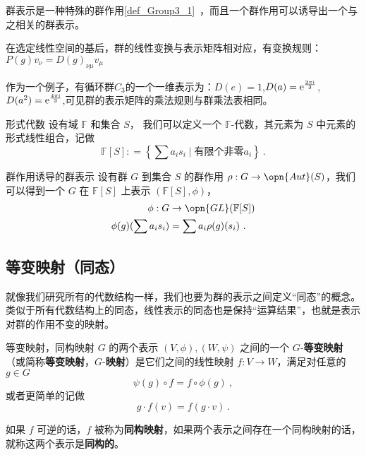 群表示是一种特殊的群作用\autoref{def_Group3_1}~，而且一个群作用可以诱导出一个与之相关的群表示。

在选定线性空间的基后，群的线性变换与表示矩阵相对应，有变换规则：$P(g)v_\nu=D(g)_{\nu\mu}v_\mu$

作为一个例子，有循环群$C_3$的一个一维表示为：$D(e)=1$,$D(a)=\rm{e}^{\frac{2\pi i}{3}}$,$D(a^2)=\rm{e}^{\frac{4\pi i}{3}}$,可见群的表示矩阵的乘法规则与群乘法表相同。


\begin{definition}{形式代数}
设有域 $\mathbb{F}$ 和集合 $S$， 我们可以定义一个 $\mathbb{F}$-代数，其元素为 $S$ 中元素的形式线性组合，记做
$$
\mathbb{F}[S]: = \left\{ \sum a_i s_i \mid \text{有限个非零} a_i \right\}~.
$$
\end{definition}

\begin{definition}{群作用诱导的群表示}
设有群 $G$ 到集合 $S$ 的群作用 $\rho: G \to \opn{Aut}(S)$，我们可以得到一个 $G$ 在 $\mathbb{F}[S]$ 上表示 $(\mathbb{F}[S], \phi)$，
$$\begin{aligned}
\phi: G &\to \opn{GL}(\mathbb{F}[S]) \\
\phi(g)(\sum a_i s_i) &= \sum a_i \rho(g)(s_i)~.
\end{aligned}$$
\end{definition}

\subsection{等变映射（同态）}


就像我们研究所有的代数结构一样，我们也要为群的表示之间定义“同态”的概念。类似于所有代数结构上的同态，线性表示的同态也是保持“运算结果”，也就是表示对群的作用不变的映射。

\begin{definition}{等变映射，同构映射}
$G$ 的两个表示 $(V, \phi), (W, \psi)$ 之间的一个 $G$-\textbf{等变映射}（或简称\textbf{等变映射}，$G$-\textbf{映射}）是它们之间的线性映射 $f: V \to W$，满足对任意的 $g \in G$
$$
\psi(g) \circ f = f \circ \phi(g)~,
$$
或者更简单的记做
$$
g \cdot f(v) = f(g \cdot v)~.
$$

如果 $f$ 可逆的话，$f$ 被称为\textbf{同构映射}，如果两个表示之间存在一个同构映射的话，就称这两个表示是\textbf{同构的}。
\end{definition}

